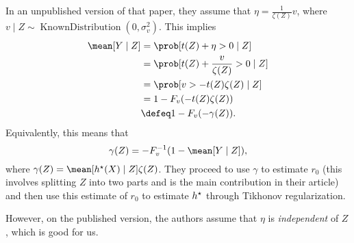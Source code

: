 In an unpublished version of that paper, they assume that $ \eta = \frac{ 1 }{ \zeta ( Z ) } v $, where $ v \mid Z \sim \operatorname{KnownDistribution}(0, \sigma_{ v }^2) $.
This implies
\begin{align*}
    \mean [ Y \mid Z ]
    &= \prob [ t ( Z ) + \eta > 0 \mid Z ] \\
    &= \prob [ t ( Z ) + \frac{ v }{ \zeta ( Z ) } > 0 \mid Z ] \\
    &= \prob [ v > - t ( Z ) \zeta ( Z ) \mid Z ] \\
    &= 1 - F_{ v } ( - t ( Z ) \zeta ( Z ) ) \\
    &\defeq 1 - F_{ v } ( - \gamma ( Z ) )
.\end{align*}
Equivalently, this means that
\begin{equation*}
    \gamma ( Z ) =  - F_{ v }^{ -1 } ( 1 - \mean [ Y \mid Z ] )
,\end{equation*}
where $ \gamma ( Z ) = \mean [ \hstar ( X ) \mid Z ] \zeta ( Z ) $.
They proceed to use $ \gamma $ to estimate $ r_{ 0 } $ (this involves splitting $ Z $ into two parts and is the main contribution in their article) and then use this estimate of $ r_{ 0 } $ to estimate $ h^{ \star } $ through Tikhonov regularization.

However, on the published version, the authors assume that $ \eta $ is \emph{independent} of $ Z $, which is good for us.
